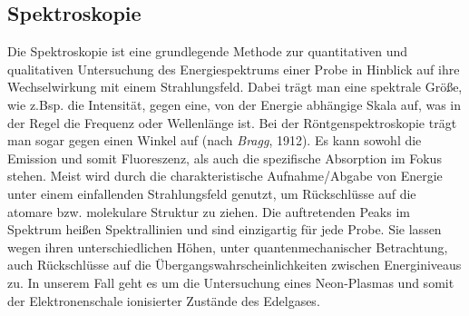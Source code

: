 \documentclass[numbers=noenddot,12pt,a4paper]{scrartcl}
\newcommand{\tilt}[1]{\textit{#1}}
\begin{document}
\subsection{Spektroskopie}
Die Spektroskopie ist eine grundlegende Methode zur quantitativen und qualitativen Untersuchung des Energiespektrums einer Probe in Hinblick auf ihre Wechselwirkung mit einem Strahlungsfeld. Dabei trägt man eine spektrale Größe, wie z.Bsp. die Intensität, gegen eine, von der Energie abhängige Skala auf, was in der Regel die Frequenz oder Wellenlänge ist. Bei der Röntgenspektroskopie trägt man sogar gegen einen Winkel auf (nach \tilt{Bragg}, 1912). Es kann sowohl die Emission und somit Fluoreszenz, als auch die spezifische Absorption im Fokus stehen. Meist wird durch die charakteristische Aufnahme/Abgabe von Energie unter einem einfallenden Strahlungsfeld genutzt, um Rückschlüsse auf die atomare bzw. molekulare Struktur zu ziehen. Die auftretenden Peaks im Spektrum heißen Spektrallinien und sind einzigartig für jede Probe. Sie lassen wegen ihren unterschiedlichen Höhen, unter quantenmechanischer Betrachtung, auch Rückschlüsse auf die Übergangswahrscheinlichkeiten zwischen Energiniveaus zu. In unserem Fall geht es um die Untersuchung eines Neon-Plasmas und somit der Elektronenschale ionisierter Zustände des Edelgases.
\end{document}
